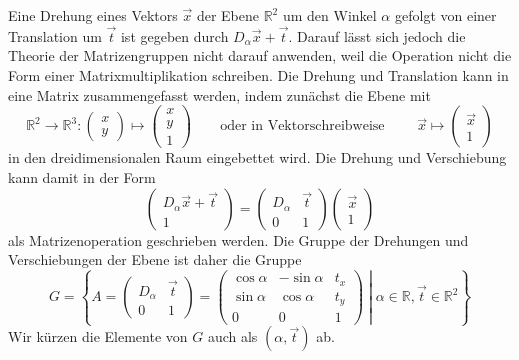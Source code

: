 Eine Drehung eines Vektors $\vec{x}$ der Ebene $\mathbb{R}^2$
um den Winkel $\alpha$ gefolgt von einer Translation um $\vec{t}$
ist gegeben durch $D_\alpha\vec{x}+\vec{t}$.
Darauf lässt sich jedoch die Theorie der Matrizengruppen nicht
darauf anwenden, weil die Operation nicht die Form einer Matrixmultiplikation
schreiben.
Die Drehung und Translation kann in eine Matrix zusammengefasst werden,
indem zunächst die Ebene mit
\[
\mathbb{R}^2\to\mathbb{R}^3
:
\begin{pmatrix}x\\y\end{pmatrix}
\mapsto
\begin{pmatrix}x\\y\\1\end{pmatrix}
\qquad\text{oder in Vektorschreibweise }\qquad
\vec{x}\mapsto\begin{pmatrix}\vec{x}\\1\end{pmatrix}
\]
in den dreidimensionalen Raum eingebettet wird.
Die Drehung und Verschiebung kann damit in der Form
\[
\begin{pmatrix}D_\alpha\vec{x}+\vec{t}\\1
\end{pmatrix}
=
\begin{pmatrix}D_\alpha&\vec{t}\\0&1\end{pmatrix}
\begin{pmatrix}\vec{x}\\1\end{pmatrix}
\]
als Matrizenoperation geschrieben werden.
Die Gruppe der Drehungen und Verschiebungen der Ebene ist daher
die Gruppe
\[
G
=
\left\{
\left.
A
=
\begin{pmatrix}
D_\alpha&\vec{t}\\
0&1
\end{pmatrix}
=
\begin{pmatrix}
\cos\alpha & -\sin\alpha & t_x \\
\sin\alpha &  \cos\alpha & t_y \\
     0     &       0     &  1
\end{pmatrix}
\;
\right|
\;
\alpha\in\mathbb{R},\vec{t}\in\mathbb{R}^2
\right\}
\]
Wir kürzen die Elemente von $G$ auch als $(\alpha,\vec{t})$ ab.
